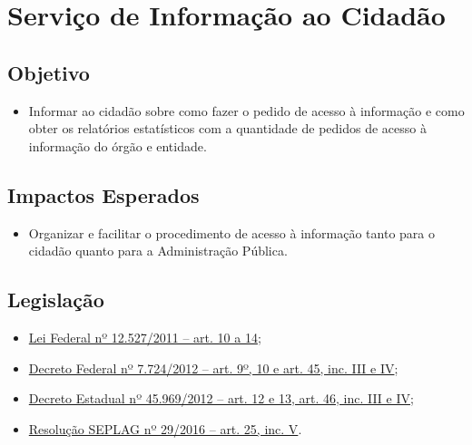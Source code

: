 \documentclass[]{book}
\providecommand{\tightlist}{%
  \setlength{\itemsep}{0pt}\setlength{\parskip}{0pt}}
\begin{document}
\hypertarget{serviuxe7o-de-informauxe7uxe3o-ao-cidaduxe3o}{%
\section{Serviço de Informação ao Cidadão}\label{serviuxe7o-de-informauxe7uxe3o-ao-cidaduxe3o}}

\hypertarget{objetivo}{%
\subsection{Objetivo}\label{objetivo}}

\begin{itemize}
\tightlist
\item
  Informar ao cidadão sobre como fazer o pedido de acesso à informação e como obter os relatórios estatísticos com a quantidade de pedidos de acesso à informação do órgão e entidade.
\end{itemize}

\hypertarget{impactos-esperados-1}{%
\subsection{Impactos Esperados}\label{impactos-esperados-1}}

\begin{itemize}
\tightlist
\item
  Organizar e facilitar o procedimento de acesso à informação tanto para o cidadão quanto para a Administração Pública.
\end{itemize}

\hypertarget{legislauxe7uxe3o-1}{%
\subsection{Legislação}\label{legislauxe7uxe3o-1}}

\begin{itemize}
\tightlist
\item
  \href{http://www.planalto.gov.br/ccivil_03/_ato2011-2014/2011/lei/l12527.htm\#art10}{Lei Federal nº 12.527/2011 -- art. 10 a 14};
\item
  \href{http://www.planalto.gov.br/ccivil_03/_ato2011-2014/2012/decreto/d7724.htm}{Decreto Federal nº 7.724/2012 -- art. 9º, 10 e art. 45, inc. III e IV};
\item
  \href{https://www.almg.gov.br/consulte/legislacao/completa/completa.html?tipo=DEC\&num=45969\&ano=2012}{Decreto Estadual nº 45.969/2012 -- art. 12 e 13, art. 46, inc. III e IV};
\item
  \href{http://www.planejamento.mg.gov.br/sites/default/files/documentos/resolucao_sitios_seplag_29_de_05_07_2016_1.pdf}{Resolução SEPLAG nº 29/2016 -- art. 25, inc. V}.
\end{itemize}
\end{document}
